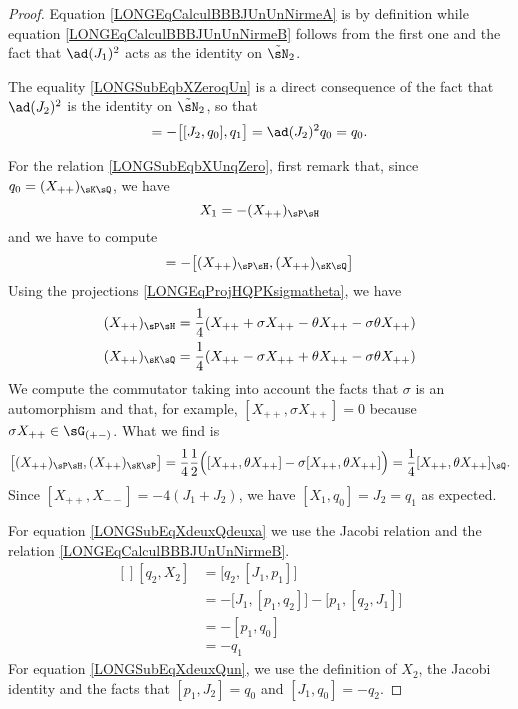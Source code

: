 \begin{proof}


	Equation \eqref{LONGEqCalculBBBJUnUnNirmeA} is by definition while equation \eqref{LONGEqCalculBBBJUnUnNirmeB} follows from the first one and the fact that $\ad(J_1)^2$ acts as the identity on $\tilde\sN_2$.

	The equality \eqref{LONGSubEqbXZeroqUn} is a direct consequence of the fact that $\ad(J_2)^2$ is the identity on $\tilde\sN_2$, so that
	\begin{equation}
		[X_1,q_1]=-\big[ [J_2,q_0],q_1 \big]=\ad(J_2)^2q_0=q_0.
	\end{equation}

	For the relation \eqref{LONGSubEqbXUnqZero}, first remark that, since $q_0=(X_{++})_{\sK\sQ}$, we have
	\begin{equation}
		X_1=-(X_{++})_{\sP\sH}
	\end{equation}
	and we have to compute
	\begin{equation}
		[X_1,q_0]=-\big[ (X_{++})_{\sP\sH},(X_{++})_{\sK\sQ} \big]
	\end{equation}
	Using the projections \eqref{LONGEqProjHQPKsigmatheta}, we have
	\begin{equation}
		\begin{aligned}[]
			(X_{++})_{\sP\sH}&=\frac{1}{ 4 }(X_{++}+\sigma X_{++}-\theta X_{++}-\sigma\theta X_{++})\\
			(X_{++})_{\sK\sQ}&=\frac{1}{ 4 }(X_{++}-\sigma X_{++}+\theta X_{++}-\sigma\theta X_{++})
		\end{aligned}
	\end{equation}
	We compute the commutator taking into account the facts that $\sigma$ is an automorphism and that, for example, $[X_{++},\sigma X_{++}]=0$ because $\sigma X_{++}\in\sG_{(+-)}$. What we find is
	\begin{equation}
		\big[ (X_{++})_{\sP\sH},(X_{++})_{\sK\sP} \big]=\frac{1}{ 4 }\frac{ 1 }{2}\Big( [X_{++},\theta X_{++}]-\sigma [X_{++},\theta X_{++}] \Big)=\frac{1}{ 4 }[X_{++},\theta X_{++}]_{\sQ}.
	\end{equation}
	Since $[X_{++},X_{--}]=-4(J_1+J_2)$, we have $[X_1,q_0]=J_2=q_1$ as expected.


	For equation \eqref{LONGSubEqXdeuxQdeuxa} we use the Jacobi relation and the relation \eqref{LONGEqCalculBBBJUnUnNirmeB}.
	\begin{equation}
		\begin{aligned}[]
			[q_2,X_2]&=\big[ q_2,[J_1,p_1] \big]\\
				&=-\big[ J_1,[p_1,q_2] \big]-\big[ p_1,[q_2,J_1] \big]\\
				&=-[p_1,q_0]\\
				&=-q_1
		\end{aligned}
	\end{equation}
	For equation \eqref{LONGSubEqXdeuxQun}, we use the definition of $X_2$, the Jacobi identity and the facts that $[p_1,J_2]=q_0$ and $[J_1,q_0]=-q_2$.


\end{proof}
